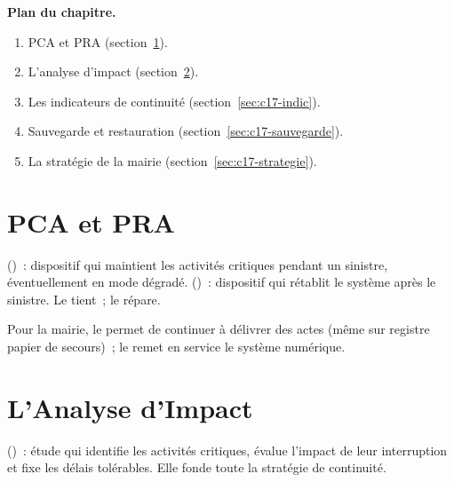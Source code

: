 \medskip
\textbf{Plan du chapitre.}
\begin{enumerate}
    \item PCA et PRA (section~\ref{sec:c17-pcapra}).
    \item L'analyse d'impact (section~\ref{sec:c17-bia}).
    \item Les indicateurs de continuité (section~\ref{sec:c17-indic}).
    \item Sauvegarde et restauration (section~\ref{sec:c17-sauvegarde}).
    \item La stratégie de la mairie (section~\ref{sec:c17-strategie}).
\end{enumerate}

\separateur

\section{PCA et PRA}
\label{sec:c17-pcapra}

\begin{boxdef}
 ()~: dispositif qui maintient
les activités critiques pendant un sinistre, éventuellement en mode dégradé.
 ()~: dispositif qui rétablit le
système après le sinistre. Le  tient~; le  répare.
\end{boxdef}

Pour la mairie, le  permet de continuer à délivrer des actes (même
sur registre papier de secours)~; le  remet en service le système
numérique.

\section{L'Analyse d'Impact}
\label{sec:c17-bia}

\begin{boxdef}
 ()~: étude qui identifie
les activités critiques, évalue l'impact de leur interruption et fixe les délais
tolérables. Elle fonde toute la stratégie de continuité.
\end{boxdef}

